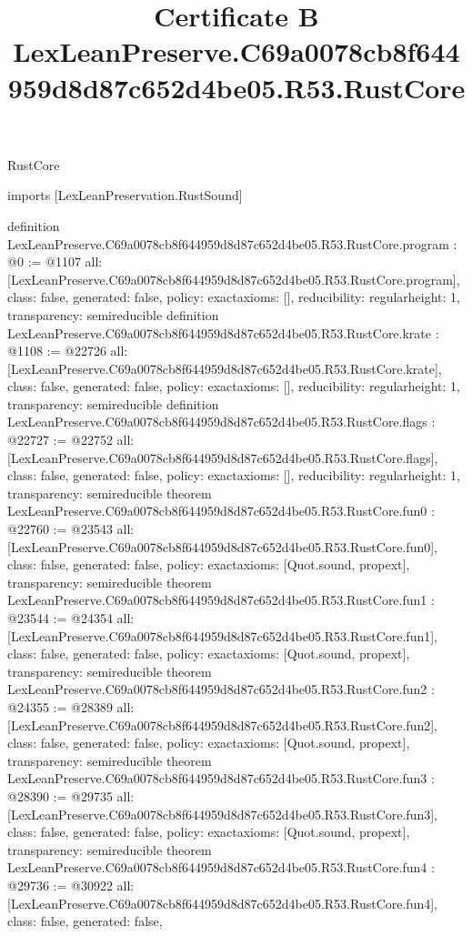 \begin{lexlean}{RustCore}
\title{Certificate B LexLeanPreserve.C69a0078cb8f644959d8d87c652d4be05.R53.RustCore}
\begin{coremodule}
imports [LexLeanPreservation.RustSound]

definition LexLeanPreserve.C69a0078cb8f644959d8d87c652d4be05.R53.RustCore.program : @0 := @1107 {
  all: [LexLeanPreserve.C69a0078cb8f644959d8d87c652d4be05.R53.RustCore.program],
  class: false,
  generated: false,
  policy: exact{axioms: []},
  reducibility: regular{height: 1},
  transparency: semireducible
}
definition LexLeanPreserve.C69a0078cb8f644959d8d87c652d4be05.R53.RustCore.krate : @1108 := @22726 {
  all: [LexLeanPreserve.C69a0078cb8f644959d8d87c652d4be05.R53.RustCore.krate],
  class: false,
  generated: false,
  policy: exact{axioms: []},
  reducibility: regular{height: 1},
  transparency: semireducible
}
definition LexLeanPreserve.C69a0078cb8f644959d8d87c652d4be05.R53.RustCore.flags : @22727 := @22752 {
  all: [LexLeanPreserve.C69a0078cb8f644959d8d87c652d4be05.R53.RustCore.flags],
  class: false,
  generated: false,
  policy: exact{axioms: []},
  reducibility: regular{height: 1},
  transparency: semireducible
}
theorem LexLeanPreserve.C69a0078cb8f644959d8d87c652d4be05.R53.RustCore.fun0 : @22760 := @23543 {
  all: [LexLeanPreserve.C69a0078cb8f644959d8d87c652d4be05.R53.RustCore.fun0],
  class: false,
  generated: false,
  policy: exact{axioms: [Quot.sound, propext]},
  transparency: semireducible
}
theorem LexLeanPreserve.C69a0078cb8f644959d8d87c652d4be05.R53.RustCore.fun1 : @23544 := @24354 {
  all: [LexLeanPreserve.C69a0078cb8f644959d8d87c652d4be05.R53.RustCore.fun1],
  class: false,
  generated: false,
  policy: exact{axioms: [Quot.sound, propext]},
  transparency: semireducible
}
theorem LexLeanPreserve.C69a0078cb8f644959d8d87c652d4be05.R53.RustCore.fun2 : @24355 := @28389 {
  all: [LexLeanPreserve.C69a0078cb8f644959d8d87c652d4be05.R53.RustCore.fun2],
  class: false,
  generated: false,
  policy: exact{axioms: [Quot.sound, propext]},
  transparency: semireducible
}
theorem LexLeanPreserve.C69a0078cb8f644959d8d87c652d4be05.R53.RustCore.fun3 : @28390 := @29735 {
  all: [LexLeanPreserve.C69a0078cb8f644959d8d87c652d4be05.R53.RustCore.fun3],
  class: false,
  generated: false,
  policy: exact{axioms: [Quot.sound, propext]},
  transparency: semireducible
}
theorem LexLeanPreserve.C69a0078cb8f644959d8d87c652d4be05.R53.RustCore.fun4 : @29736 := @30922 {
  all: [LexLeanPreserve.C69a0078cb8f644959d8d87c652d4be05.R53.RustCore.fun4],
  class: false,
  generated: false,
}
\end{coremodule}
\end{lexlean}
